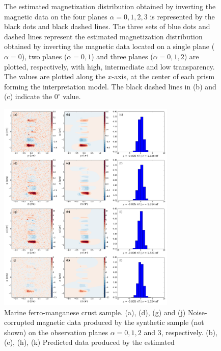 \documentclass[draft,gc]{agutex}
\begin{document}
\begin{figure}
{ The estimated magnetization distribution obtained by 
 inverting the magnetic data on the four planes $\alpha = 0, 1, 2, 3$
 is represented
 by the black dots and black dashed lines. The three sets of
 blue dots and dashed lines represent the estimated 
 magnetization distribution obtained by inverting the 
 magnetic data located on a single plane ($\alpha = 0$),
 two planes ($\alpha = 0, 1$) and three planes ($\alpha = 0, 1, 2$)
 are plotted, respectively, with high, intermediate and low 
 transparency.
 The values are plotted along the $x$-axis, at the center of each 
 prism forming the interpretation model.
 The black dashed lines in (b) and (c) indicate the $0^{\circ}$ value.}
 \label{fig:estimate-sensor2sample}
 \end{figure}
 
 \begin{figure}
 \noindent \includegraphics[width=20pc]{Figs/Fig11_LQ.png}
 \caption{Marine ferro-manganese crust sample. (a), (d), (g) and (j) Noise-corrupted
 magnetic data produced by the synthetic sample (not shown) on the
 observation planes $\alpha = 0, 1, 2$ and $3$, respectively.
 (b), (e), (h), (k) Predicted data produced by the estimated
}
\end{figure}
\end{document}
